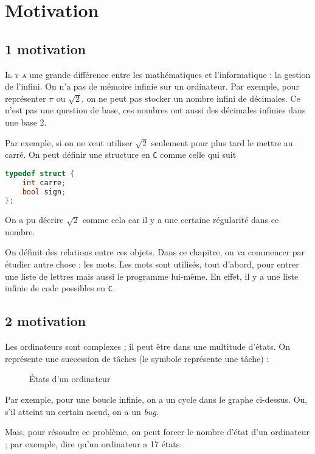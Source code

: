 \section{Motivation}

\subsection{{1} motivation}

\lettrine{I}{l y a} une grande différence entre les mathématiques et l'informatique : la gestion de l'infini.
On n'a pas de mémoire infinie sur un ordinateur.
Par exemple, pour représenter $\pi$\/ ou $\sqrt{2}$, on ne peut pas stocker un nombre infini de décimales. Ce n'est pas une question de base, ces nombres ont aussi des décimales infinies dans une base 2.

Par exemple, si on ne veut utiliser $\sqrt{2}$\/ seulement pour plus tard le mettre au carré. On peut définir une structure en {\tt C}\/ comme celle qui suit
\begin{lstlisting}[language=c, caption=$\sqrt{2}$\/ sous forme de structure]
typedef struct {
	int carre;
	bool sign;
};
\end{lstlisting}
On a pu décrire $\sqrt{2}$\/ comme cela car il y a une certaine régularité dans ce nombre.

On définit des relations entre ces objets. Dans ce chapitre, on va commencer par étudier autre chose : les mots.
Les mots sont utilisés, tout d'abord, pour entrer une liste de lettres mais aussi le programme lui-même. En effet, il y a une liste infinie de code possibles en {\tt C}.

\subsection{{2} motivation}

Les ordinateurs sont complexes ; il peut être dans une multitude d'états.
On représente une succession de tâches (le symbole {} représente une tâche) : 
\begin{figure}[H]
	\centering
	\caption{États d'un ordinateur}
\end{figure}
\noindent Par exemple, pour une boucle infinie, on a un cycle dans le graphe ci-dessus. Ou, s'il atteint un certain nœud, on a un {\it bug}.

Mais, pour résoudre ce problème, on peut forcer le nombre d'état d'un ordinateur ; par exemple, dire qu'un ordinateur a 17 états.

